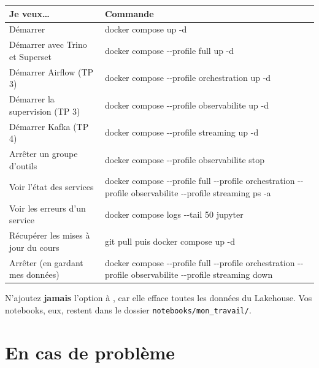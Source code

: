 \begin{center}
\renewcommand{\arraystretch}{1.25}
\begin{tabularx}{\textwidth}{@{}l >{\ttfamily}X@{}}
\toprule
\textbf{Je veux\dots} & \textbf{\normalfont Commande} \\
\midrule
Démarrer                           & docker compose up -d \\
Démarrer avec Trino et Superset    & docker compose -{}-profile full up -d \\
Démarrer Airflow (TP 3)            & docker compose -{}-profile orchestration up -d \\
Démarrer la supervision (TP 3)     & docker compose -{}-profile observabilite up -d \\
Démarrer Kafka (TP 4)              & docker compose -{}-profile streaming up -d \\
Arrêter un groupe d'outils         & docker compose -{}-profile observabilite stop \\
Voir l'état des services           & docker compose -{}-profile full -{}-profile orchestration -{}-profile observabilite -{}-profile streaming ps -a \\
Voir les erreurs d'un service      & docker compose logs -{}-tail 50 jupyter \\
Récupérer les mises à jour du cours & git pull \quad \textrm{puis} \quad docker compose up -d \\
Arrêter (en gardant mes données)   & docker compose -{}-profile full -{}-profile orchestration -{}-profile observabilite -{}-profile streaming down \\
\bottomrule
\end{tabularx}
\end{center}

\begin{attention}
N'ajoutez \textbf{jamais} l'option  à , car elle efface toutes les
données du Lakehouse. Vos notebooks, eux, restent dans le dossier \texttt{notebooks/mon\_travail/}.
\end{attention}

\section{En cas de problème}

